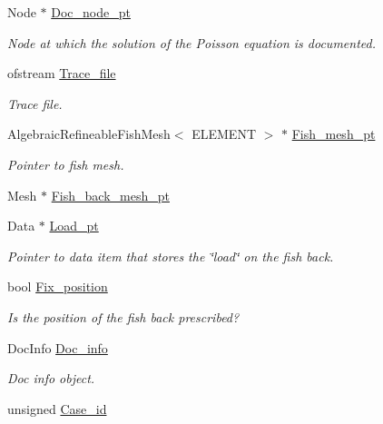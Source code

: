 \begin{DoxyCompactItemize}
\item 
Node $\ast$ \hyperlink{classRefineableFishPoissonProblem_a5dce47aa14fdbc33d8a865f4f4b1e1ea}{Doc\+\_\+node\+\_\+pt}
\begin{DoxyCompactList}\small\item\em Node at which the solution of the Poisson equation is documented. \end{DoxyCompactList}\item 
ofstream \hyperlink{classRefineableFishPoissonProblem_aa358e2b0fa91780bdca32ae4676717ff}{Trace\+\_\+file}
\begin{DoxyCompactList}\small\item\em Trace file. \end{DoxyCompactList}\item 
Algebraic\+Refineable\+Fish\+Mesh$<$ E\+L\+E\+M\+E\+NT $>$ $\ast$ \hyperlink{classRefineableFishPoissonProblem_af915f09b6e4ae2f4ded2ad1a25ed7f01}{Fish\+\_\+mesh\+\_\+pt}
\begin{DoxyCompactList}\small\item\em Pointer to fish mesh. \end{DoxyCompactList}\item 
Mesh $\ast$ \hyperlink{classRefineableFishPoissonProblem_ac0f6f58b393715961214d98e11dfad57}{Fish\+\_\+back\+\_\+mesh\+\_\+pt}
\item 
Data $\ast$ \hyperlink{classRefineableFishPoissonProblem_a9a9ce82a4308be486701578134d06210}{Load\+\_\+pt}
\begin{DoxyCompactList}\small\item\em Pointer to data item that stores the \char`\"{}load\char`\"{} on the fish back. \end{DoxyCompactList}\item 
bool \hyperlink{classRefineableFishPoissonProblem_a51c10ea7cbf4ab61fd953f011f72a1c4}{Fix\+\_\+position}
\begin{DoxyCompactList}\small\item\em Is the position of the fish back prescribed? \end{DoxyCompactList}\item 
Doc\+Info \hyperlink{classRefineableFishPoissonProblem_ad6d382f1d38425323627f34e0559b28f}{Doc\+\_\+info}
\begin{DoxyCompactList}\small\item\em Doc info object. \end{DoxyCompactList}\item 
unsigned \hyperlink{classRefineableFishPoissonProblem_af6f409d7fe711ad809d9e784d98ca036}{Case\+\_\+id}

\end{DoxyCompactItemize}
